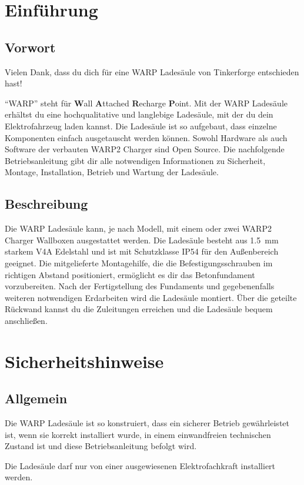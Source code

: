 \documentclass[a4paper,10pt]{article}
\newcommand{\hint}[1]{\begin{tcolorbox}[colback=boxgray,colframe=black,coltext=
white,title=Hinweis]#1\end{tcolorbox}}
\begin{document}
\begin{multicols*}{2}
	\tableofcontents \section{Einführung}
	\subsection{Vorwort} Vielen Dank, dass du
	dich für eine WARP Ladesäule von Tinkerforge entschieden hast!

	\enquote{WARP} steht
	für \textbf{W}all \textbf{A}ttached
	\textbf{R}echarge \textbf{P}oint. Mit der WARP Ladesäule
	erhältst du eine hochqualitative und langlebige Ladesäule, mit der du dein
	Elektrofahrzeug laden kannst. Die Ladesäule ist so aufgebaut, dass
	einzelne Komponenten einfach ausgetauscht werden können. Sowohl Hardware als
	auch Software der verbauten WARP2 Charger sind Open Source. Die nachfolgende Betriebsanleitung gibt dir	alle notwendigen Informationen zu Sicherheit, Montage, Installation, Betrieb
	und Wartung der Ladesäule.

	\subsection{Beschreibung}

	Die WARP Ladesäule kann, je nach Modell, mit einem oder zwei WARP2 Charger Wallboxen
	ausgestattet werden. Die Ladesäule besteht aus
	\SI{1.5}{\milli\meter} starkem V4A Edelstahl und ist mit Schutzklasse IP54 für den
	Außenbereich geeignet. Die mitgelieferte Montagehilfe, die die Befestigungsschrauben im
	richtigen Abstand positioniert, ermöglicht es dir das Betonfundament
	vorzubereiten.
	Nach der Fertigstellung des Fundaments und gegebenenfalls weiteren
	notwendigen Erdarbeiten wird die Ladesäule montiert.
	Über die geteilte Rückwand kannst du
	die Zuleitungen erreichen und die Ladesäule bequem anschließen. 
\vspace{-0.2cm}
	\section{Sicherheitshinweise}
\vspace{-0.1cm}
	\subsection{Allgemein}
	Die WARP Ladesäule ist so konstruiert, dass ein sicherer Betrieb gewährleistet ist,
	wenn sie korrekt installiert wurde, in einem einwandfreien technischen Zustand
	ist und diese Betriebsanleitung befolgt wird. \hint{Die Ladesäule darf nur von einer ausgewiesenen Elektrofachkraft installiert
		werden.}
\vspace{-0.1cm}

\end{multicols*}
\end{document}
